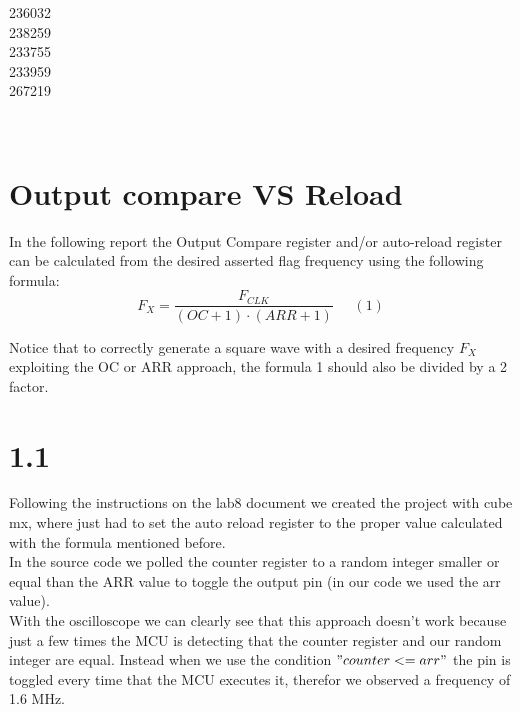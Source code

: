 \documentclass[12pt]{article}
\begin{document}
\begin{titlepage}
\begin{minipage}{0.4\textwidth}
			\begin{flushright} \large
			236032\\													%
			238259\\
            233755\\
            233959\\
            267219\\
            
		\end{flushright}
        
	\end{minipage}\\[2 cm]
	
\end{titlepage}

\newpage

\section*{Output compare VS Reload}
{
	
	In the following report the Output Compare register and/or auto-reload register can be calculated from the desired asserted flag frequency using the following formula:
	\[F_{X}=\frac{F_{CLK}}{(OC+1)\cdot(ARR+1)}\;\;\;\;\; (1)\] 
	
	Notice that to correctly generate a square wave with a desired frequency $F_{X}$ exploiting the OC or ARR approach, the formula 1 should also be divided by a 2 factor.
}

\section*{1.1 }
Following the instructions on the lab8 document we created the project with cube mx, where just had to set the auto reload register to the proper value calculated with the formula mentioned before.\\
In the source code we polled the counter register to a random integer smaller or equal than the ARR value to toggle the output pin (in our code we used the arr value). \\
With the oscilloscope we can clearly see that this approach doesn't work because just a few times the MCU is detecting that the counter register and our random integer are equal. Instead when we use the condition $"counter<=arr"$ the pin is toggled every time that the MCU executes it, therefor we observed a frequency of 1.6 MHz.
\end{document}
